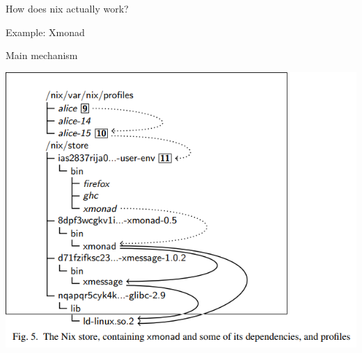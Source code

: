 \documentclass[presentation]{beamer}
\begin{document}
\begin{frame}[label={sec:org6d29320},fragile]{How does nix actually work?}
\begin{block}{Example: Xmonad}
\begin{center}
\end{center}
\end{block}
\begin{block}{Main mechanism}
\begin{center}
\includegraphics[width=.9\linewidth]{./images/screenshot-08.png}
\end{center}
\end{block}
\end{frame}
\end{document}
